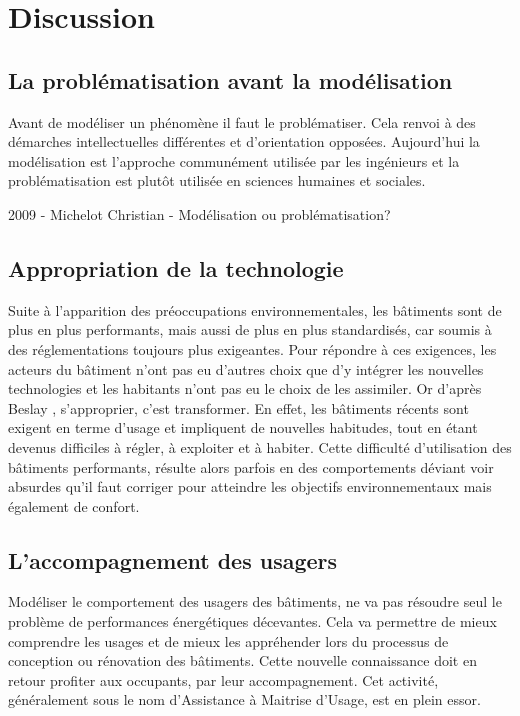 \chapter{Discussion}

\section{La problématisation avant la modélisation}

Avant de modéliser un phénomène il faut le problématiser. Cela renvoi à des démarches intellectuelles différentes et d'orientation opposées. Aujourd'hui la modélisation est l'approche communément utilisée par les ingénieurs et la problématisation est plutôt utilisée en sciences humaines et sociales.

2009 - Michelot Christian - Modélisation ou problématisation?

\section{Appropriation de la technologie}

Suite à l'apparition des préoccupations environnementales, les bâtiments sont de plus en plus performants, mais aussi de plus en plus standardisés, car soumis à des réglementations toujours plus exigeantes. Pour répondre à ces exigences, les acteurs du bâtiment n'ont pas eu d'autres choix que d'y intégrer les nouvelles technologies et les habitants n'ont pas eu le choix de les assimiler. Or d'après Beslay \cite{Beslay-08}, s'approprier, c'est transformer. En effet, les bâtiments récents sont exigent en terme d'usage et impliquent de nouvelles habitudes, tout en étant devenus difficiles à régler, à exploiter et à habiter. Cette difficulté d'utilisation des bâtiments performants, résulte alors parfois en des comportements déviant voir absurdes qu'il faut corriger pour atteindre les objectifs environnementaux mais également de confort.

\section{L'accompagnement des usagers}

Modéliser le comportement des usagers des bâtiments, ne va pas résoudre seul le problème de performances énergétiques décevantes. Cela va permettre de mieux comprendre les usages et de mieux les appréhender lors du processus de conception ou rénovation des bâtiments. Cette nouvelle connaissance doit en retour profiter aux occupants, par leur accompagnement. Cet activité, généralement sous le nom d'Assistance à Maitrise d'Usage, est en plein essor. 

